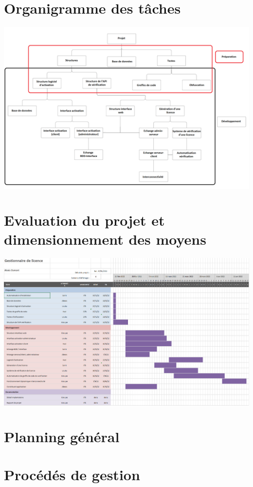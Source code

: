 \chapter{Organigramme des tâches}
\includegraphics[width=15cm]{organi2png.png}

\chapter{Evaluation du projet et dimensionnement des moyens}
\includegraphics[width=15cm]{Gantt.png}

\chapter{Planning général}

\chapter{Procédés de gestion}
